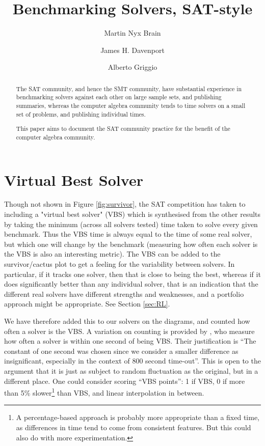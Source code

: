 \documentclass{easychair}
\begin{document}
\title{Benchmarking Solvers, SAT-style}
\author{Martin Nyx Brain \and James H. Davenport \and Alberto Griggio}
\maketitle
\begin{abstract}\noindent
The SAT community, and hence the SMT community, have substantial experience in benchmarking solvers against each other on large sample sets, and publishing summaries, whereas the computer algebra community tends to time solvers on a small set of problems, and publishing individual times.
\par
This paper aims to document the SAT community practice for the benefit of the computer algebra community.
\end{abstract}

\section{Virtual Best Solver}
Though not shown in  Figure  \ref{fig:survivor}, the SAT competition has taken to including a "virtual best solver" (VBS)
which is synthesised from the other results by taking the minimum (across all solvers tested) time taken to solve every given benchmark.
Thus the VBS time is always equal to the time of some real solver, but which one will change by the benchmark (measuring how often each solver is the VBS is also an interesting metric).  The VBS can be added to the survivor/cactus plot to get a feeling for the variability between solvers. In particular, if it tracks one solver, then that is close to being the best, whereas if it does significantly better than any individual solver, that is an indication that the different real solvers have different strengths and weaknesses, and a portfolio approach might be appropriate. See Section \ref{sec:RL}.
\par
We have therefore added this to our solvers on the diagrams, and counted how often a solver is the VBS. A variation on counting is provided by \cite{Janotaetal2016a}, who measure how often a solver is within one second of being VBS. Their justification is ``The constant of one second was chosen since we consider a smaller difference as insignificant, especially in the context of 800 second time-out''.
This is open to the argument that it is just as subject to random fluctuation as the original, but in a different place. One could consider scoring ``VBS points'': 1 if VBS, 0 if more than 5\% slower\footnote{A percentage-based approach is probably more appropriate than a fixed time, as differences in time tend to come from consistent features. But this could also do with more experimentation.} than VBS, and linear  interpolation in between.
\end{document}
